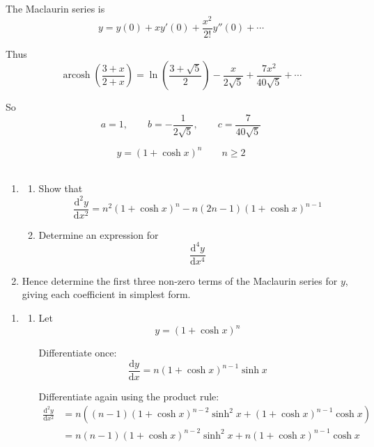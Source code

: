 \documentclass[leqno]{article}
\begin{document}
\begin{enumerate}[
  label=\textbf{\arabic*.},
  leftmargin=*,
  topsep=0pt,
  partopsep=0pt,
  parsep=0pt
]
\begin{djsSolution}
\begin{enumerate}[label=\textbf{(\alph*)}]
The Maclaurin series is
\[
y
=
y(0)
+xy'(0)
+\frac{x^2}{2!}y''(0)
+\cdots
\]

Thus
\[
\operatorname{arcosh}\left(\frac{3+x}{2+x}\right)
=
\ln\left(\frac{3+\sqrt5}{2}\right)
-\frac{x}{2\sqrt5}
+\frac{7x^2}{40\sqrt5}
+\cdots
\]

So
\[
a=1,\qquad b=-\frac{1}{2\sqrt5},\qquad c=\frac{7}{40\sqrt5}
\]
\end{enumerate}
\end{djsSolution}


\newpage

\questionitem

\[ y=(1+\cosh x)^n \qquad n\geq 2\] \\
\begin{enumerate}[label=\textbf{(\alph*)}]
  \item
  \begin{enumerate}[label=(\roman*)]
    \item Show that
    \[
    \frac{\mathrm{d}^2 y}{\mathrm{d}x^2}=n^2(1+\cosh x)^n-n(2n-1)(1+\cosh x)^{n-1}
    \]
    \item Determine an expression for
    \[
    \frac{\mathrm{d}^4 y}{\mathrm{d}x^4}
    \]
  \end{enumerate}
  \item Hence determine the first three non-zero terms of the Maclaurin series for $y$, giving each coefficient in simplest form.  \\
\end{enumerate}

\vspace*{10pt}

\begin{djsSolution}
\begin{enumerate}[label=\textbf{(\alph*)}]
  \item
  \begin{enumerate}[label=(\roman*)]
    \item Let
    \[
    y=(1+\cosh x)^n
    \]

    Differentiate once:
    \[
    \frac{\mathrm{d}y}{\mathrm{d}x}=n(1+\cosh x)^{n-1}\sinh x
    \]

    Differentiate again using the product rule:
    \begin{align*}
    \frac{\mathrm{d}^2y}{\mathrm{d}x^2}
    &=n\left((n-1)(1+\cosh x)^{n-2}\sinh^2 x+(1+\cosh x)^{n-1}\cosh x\right) \\
    &=n(n-1)(1+\cosh x)^{n-2}\sinh^2 x+n(1+\cosh x)^{n-1}\cosh x
    \end{align*}


\end{enumerate}
\end{enumerate}
\end{djsSolution}
\end{enumerate}
\end{document}
